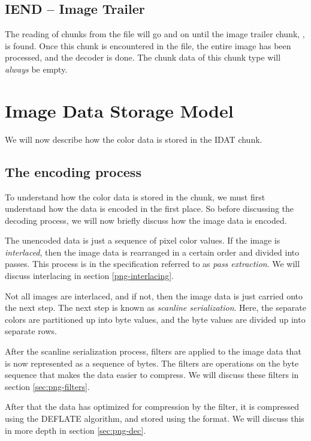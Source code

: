 \subsection{IEND -- Image Trailer}

The reading of chunks from the \png file will go and on until the image
trailer chunk, , is found. Once this chunk is encountered
in the file, the entire image has been processed, and the decoder is
done. The chunk data of this chunk type will \textit{always} be empty.

\section{Image Data Storage Model}
\label{sec:png-image-data-storage}

We will now describe how the color data is stored in the IDAT chunk.

\subsection{The encoding process}

To understand how the color data is stored in the \IDAT chunk, we must
first understand how the data is encoded in the first place. So before
discussing the decoding process, we will now briefly discuss how the
image data is encoded.

The unencoded data is just a sequence of pixel color values. If the
image is \textit{interlaced}, then the image data is rearranged in a
certain order and divided into passes. This process is in the \png
specification referred to as \textit{pass extraction}. We will discuss
interlacing in section \ref{png-interlacing}.

Not all images are interlaced, and if not, then the image data is just
carried onto the next step. The next step is known as \textit{scanline
  serialization}. Here, the separate colors are partitioned up into
byte values, and the byte values are divided up into separate rows.



After the scanline serialization process, filters are applied to the
image data that is now represented as a sequence of bytes. The filters
are operations on the byte sequence that makes the data easier to
compress. We will discuss these filters in section
\ref{sec:png-filters}.

After that the data has optimized for compression by the filter, it is
compressed using the DEFLATE algorithm, and stored using the \zlib
format. We will discuss this in more depth in section \ref{sec:png-dec}.

